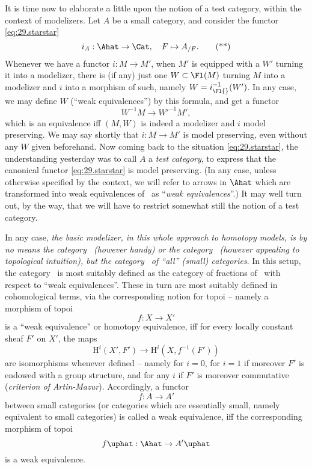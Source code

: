 \label{sec:29}%
It is time now to elaborate a little upon the notion of a test
category, within the context of modelizers. Let $A$ be a small
category, and consider the functor \eqref{eq:29.starstar}
\begin{equation}
  \label{eq:29.starstar}
  i_A : \Ahat \to \Cat, \quad F \mapsto A_{/F}.\tag{**}
\end{equation}
Whenever we have a functor $i: M \to M'$, when $M'$ is equipped with a
$W'$ turning it into a modelizer, there is (if any) just one $W
\subset \Fl(M)$ turning $M$ into a modelizer and $i$ into a morphism
of such, namely $W = i_{\Fl{}}^{-1}(W')$. In any case, we may define
$W$ (``weak equivalences'') by this formula, and get a functor
\[ W^{-1}M \to W'^{-1}M',\]
which is an equivalence if{f} $(M,W)$ is indeed a modelizer and $i$
model preserving. We may say shortly that $i:M\to M'$ is model
preserving, even without any $W$ given beforehand. Now coming back to
the situation \eqref{eq:29.starstar}, the understanding yesterday was
to call $A$ a \emph{test category}, to express that the canonical
functor \eqref{eq:29.starstar} is model preserving. (In any case,
unless otherwise specified by the context, we will refer to arrows in
$\Ahat$ which are transformed into weak equivalences of \Cat\ as
``\emph{weak equivalences}''.) It may well turn out, by the way, that
we will have to restrict somewhat still the notion of a test category.

In any case, \emph{the basic modelizer, in this whole approach to homotopy
models, is by no means the category \Sssets\ (however handy) or the
category \Spaces\ (however appealing to topological intuition), but
the category \Cat\ of ``all'' (small) categories}. In this setup, the
category \Hot\ is most suitably defined as the category of fractions
of \Cat\ with respect to ``weak equivalences''. These in turn are most
suitably defined in cohomological terms, via the corresponding notion
for topoi -- namely a morphism of topoi
\[ f : X \to X' \]
is a ``weak equivalence'' or homotopy equivalence, if{f} for every
locally constant sheaf $F'$ on $X'$, the maps
\[ \mathrm H^i(X',F') \to \mathrm H^i(X, f^{-1}(F') ) \]
are isomorphisms whenever defined -- namely for $i=0$, for $i=1$ if
moreover $F'$ is endowed with a group structure, and for any $i$ if
$F'$ is moreover commutative (\emph{criterion of Artin-Mazur}). Accordingly,
a functor
\[f : A \to A'\]
between small categories (or categories which are essentially small,
namely equivalent to small categories) is called a weak equivalence,
if{f} the corresponding morphism of topoi
\[ f\uphat : \Ahat \to {A'}\uphat \]
is a weak equivalence.

